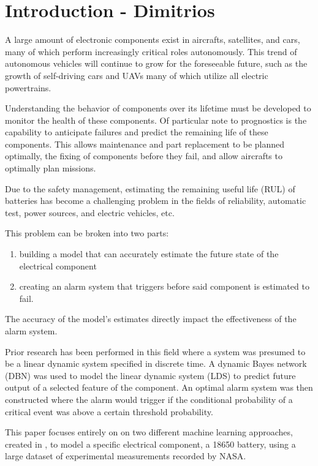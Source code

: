 
\section{Introduction - Dimitrios}

A large amount of electronic components exist in aircrafts, satellites, and cars, many of which perform increasingly critical roles autonomously.  This trend of autonomous vehicles will continue to grow for the foreseeable future, such as the growth of self-driving cars and UAVs many of which utilize all electric powertrains.

Understanding the behavior of components over its lifetime must be developed to monitor the health of these components.  Of particular note to prognostics is the capability to anticipate failures and predict the remaining life of these components.  This allows maintenance and part replacement to be planned optimally, the fixing of components before they fail, and allow aircrafts to optimally plan missions.

Due to the safety management, estimating the remaining useful life (RUL) of \lib batteries has become a challenging problem in the fields of reliability, automatic test, power sources, and electric vehicles, etc. 

This problem can be broken into two parts: 
\begin{enumerate}
\item building a model that can accurately estimate the future state of the electrical component
\item creating an alarm system that triggers before said component is estimated to fail.  
\end{enumerate}
The accuracy of the model’s estimates directly impact the effectiveness of the alarm system.

Prior research has been performed in this field where a system was presumed to be a linear dynamic system specified in discrete time.  A dynamic Bayes network (DBN) was used to model the linear dynamic system (LDS) to predict future output of a selected feature of the component.  An optimal alarm system was then constructed where the alarm would trigger if the conditional probability of a critical event was above a certain threshold probability.

This paper focuses entirely on on two different machine learning approaches, created in \MATLAB, to model a specific electrical component, a 18650 \lib battery, using a large dataset of experimental measurements recorded by NASA.



